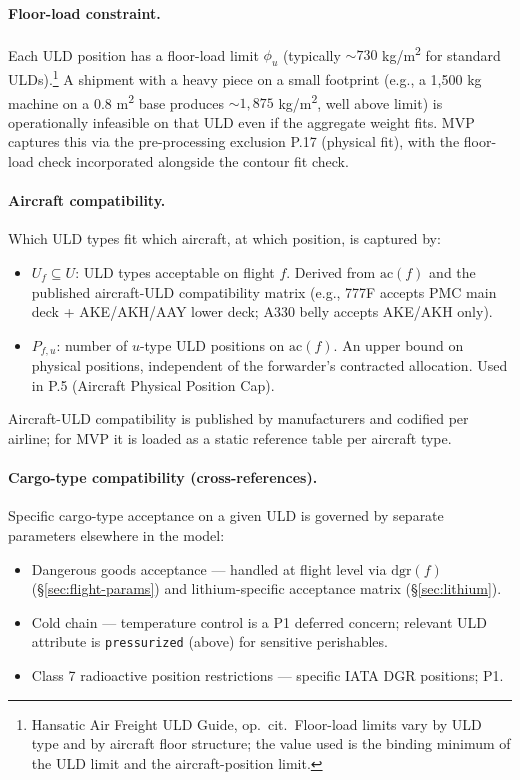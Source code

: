 \documentclass[11pt,a4paper]{article}
\theoremstyle{definition}
\begin{document}
\paragraph{Floor-load constraint.}
Each ULD position has a floor-load limit $\phi_u$ (typically $\sim 730$ kg/m\textsuperscript{2}
for standard ULDs).\footnote{Hansatic Air Freight ULD Guide, op.\ cit.\ Floor-load limits
vary by ULD type and by aircraft floor structure; the value used is the binding minimum
of the ULD limit and the aircraft-position limit.} A shipment with a heavy piece on a
small footprint (e.g., a 1{,}500 kg machine on a 0.8 m\textsuperscript{2} base produces
$\sim 1{,}875$ kg/m\textsuperscript{2}, well above limit) is operationally infeasible on
that ULD even if the aggregate weight fits. MVP captures this via the pre-processing
exclusion P.17 (physical fit), with the floor-load check incorporated alongside the
contour fit check.

\paragraph{Aircraft compatibility.}
Which ULD types fit which aircraft, at which position, is captured by:
\begin{itemize}[noitemsep]
  \item $U_f \subseteq U$: ULD types acceptable on flight $f$. Derived from $\text{ac}(f)$
        and the published aircraft-ULD compatibility matrix (e.g., 777F accepts PMC main
        deck + AKE/AKH/AAY lower deck; A330 belly accepts AKE/AKH only).
  \item $P_{f,u}$: number of $u$-type ULD positions on $\text{ac}(f)$. An upper bound on
        physical positions, independent of the forwarder's contracted allocation. Used
        in P.5 (Aircraft Physical Position Cap).
\end{itemize}
Aircraft-ULD compatibility is published by manufacturers and codified per airline; for
MVP it is loaded as a static reference table per aircraft type.

\paragraph{Cargo-type compatibility (cross-references).}
Specific cargo-type acceptance on a given ULD is governed by separate parameters
elsewhere in the model:
\begin{itemize}[noitemsep]
  \item Dangerous goods acceptance --- handled at flight level via $\text{dgr}(f)$
        (\S\ref{sec:flight-params}) and lithium-specific acceptance matrix
        (\S\ref{sec:lithium}).
  \item Cold chain --- temperature control is a P1 deferred concern; relevant ULD
        attribute is \texttt{pressurized} (above) for sensitive perishables.
  \item Class 7 radioactive position restrictions --- specific IATA DGR positions; P1.
\end{itemize}
\end{document}
